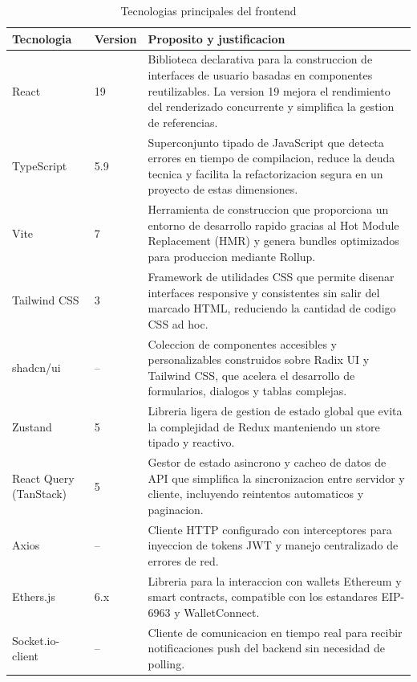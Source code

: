 \documentclass[11pt, a4paper]{article}
\begin{document}
\begin{table}[H]
\centering
\renewcommand{\arraystretch}{1.4}
\small
\begin{tabular}{@{}llp{7.5cm}@{}}
\toprule
\textbf{Tecnologia} & \textbf{Version} & \textbf{Proposito y justificacion} \\
\midrule
React & 19 & Biblioteca declarativa para la construccion de interfaces de usuario basadas en componentes reutilizables. La version 19 mejora el rendimiento del renderizado concurrente y simplifica la gestion de referencias. \\
TypeScript & 5.9 & Superconjunto tipado de JavaScript que detecta errores en tiempo de compilacion, reduce la deuda tecnica y facilita la refactorizacion segura en un proyecto de estas dimensiones. \\
Vite & 7 & Herramienta de construccion que proporciona un entorno de desarrollo rapido gracias al Hot Module Replacement (HMR) y genera bundles optimizados para produccion mediante Rollup. \\
Tailwind CSS & 3 & Framework de utilidades CSS que permite disenar interfaces responsive y consistentes sin salir del marcado HTML, reduciendo la cantidad de codigo CSS ad hoc. \\
shadcn/ui & -- & Coleccion de componentes accesibles y personalizables construidos sobre Radix UI y Tailwind CSS, que acelera el desarrollo de formularios, dialogos y tablas complejas. \\
Zustand & 5 & Libreria ligera de gestion de estado global que evita la complejidad de Redux manteniendo un store tipado y reactivo. \\
React Query (TanStack) & 5 & Gestor de estado asincrono y cacheo de datos de API que simplifica la sincronizacion entre servidor y cliente, incluyendo reintentos automaticos y paginacion. \\
Axios & -- & Cliente HTTP configurado con interceptores para inyeccion de tokens JWT y manejo centralizado de errores de red. \\
Ethers.js & 6.x & Libreria para la interaccion con wallets Ethereum y smart contracts, compatible con los estandares EIP-6963 y WalletConnect. \\
Socket.io-client & -- & Cliente de comunicacion en tiempo real para recibir notificaciones push del backend sin necesidad de polling. \\
\bottomrule
\end{tabular}
\caption{Tecnologias principales del frontend}
\label{tab:tech-frontend}
\end{table}
\end{document}
